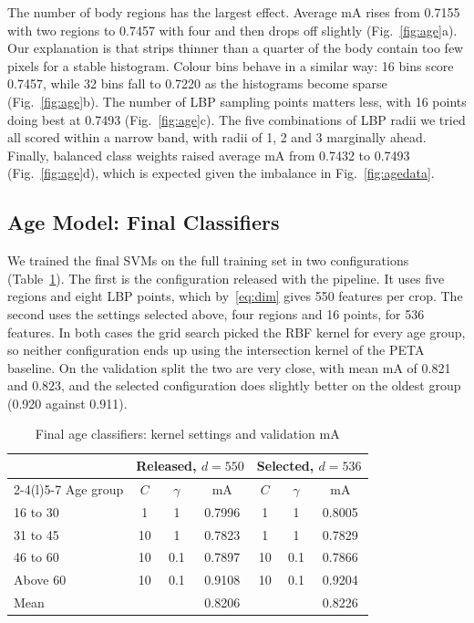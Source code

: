 \documentclass[conference]{IEEEtran}
\newcommand{\mA}{\mathrm{mA}}
\begin{document}
The number of body regions has the largest effect. Average $\mA$ rises from 0.7155
with two regions to 0.7457 with four and then drops off slightly
(Fig.~\ref{fig:age}a). Our explanation is that strips thinner than a quarter of
the body contain too few pixels for a stable histogram. Colour bins behave in a
similar way: 16 bins score 0.7457, while 32 bins fall to 0.7220 as the histograms
become sparse (Fig.~\ref{fig:age}b). The number of LBP sampling points matters
less, with 16 points doing best at 0.7493 (Fig.~\ref{fig:age}c). The five
combinations of LBP radii we tried all scored within a narrow band, with radii of
1, 2 and 3 marginally ahead. Finally, balanced class weights raised average $\mA$
from 0.7432 to 0.7493 (Fig.~\ref{fig:age}d), which is expected given the imbalance
in Fig.~\ref{fig:agedata}.

\subsection{Age Model: Final Classifiers}
We trained the final SVMs on the full training set in two configurations
(Table~\ref{tab:age-results}). The first is the configuration released with the
pipeline. It uses five regions and eight LBP points, which by~\eqref{eq:dim} gives
550 features per crop. The second uses the settings selected above, four regions
and 16 points, for 536 features. In both cases the grid search picked the RBF
kernel for every age group, so neither configuration ends up using the
intersection kernel of the PETA baseline. On the validation split the two are very
close, with mean $\mA$ of 0.821 and 0.823, and the selected configuration does
slightly better on the oldest group (0.920 against 0.911).

\begin{table}[t]
\caption{Final age classifiers: kernel settings and validation mA}
\label{tab:age-results}
\centering
\begin{tabular}{@{}lcccccc@{}}
\toprule
 & \multicolumn{3}{c}{Released, $d=550$} & \multicolumn{3}{c}{Selected, $d=536$} \\
\cmidrule(lr){2-4}\cmidrule(l){5-7}
Age group & $C$ & $\gamma$ & $\mA$ & $C$ & $\gamma$ & $\mA$ \\
\midrule
16 to 30 & 1  & 1   & 0.7996 & 1  & 1   & 0.8005 \\
31 to 45 & 10 & 1   & 0.7823 & 1  & 1   & 0.7829 \\
46 to 60 & 10 & 0.1 & 0.7897 & 10 & 0.1 & 0.7866 \\
Above 60 & 10 & 0.1 & 0.9108 & 10 & 0.1 & 0.9204 \\
\midrule
Mean     &    &     & 0.8206 &    &     & 0.8226 \\
\bottomrule
\end{tabular}
\end{table}
\end{document}
